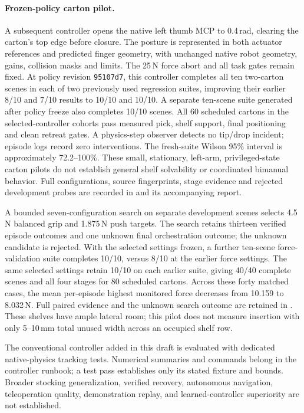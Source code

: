 \paragraph{Frozen-policy carton pilot.}
A subsequent controller opens the native left thumb MCP to 0.4\,rad, clearing
the carton's top edge before closure. The posture is represented in both actuator
references and predicted finger geometry, with unchanged native robot geometry,
gains, collision masks and limits. The 25\,N force abort and all task gates remain
fixed. At policy revision \texttt{95107d7}, this controller completes all ten
two-carton scenes in each of two previously used regression suites, improving
their earlier 8/10 and 7/10 results to 10/10 and 10/10. A separate ten-scene suite
generated after policy freeze also completes 10/10 scenes. All 60 scheduled
cartons in the selected-controller cohorts pass measured pick, shelf support,
final positioning and clean retreat gates. A physics-step observer detects no
tip/drop incident; episode logs record zero interventions.
The fresh-suite Wilson 95\% interval is approximately 72.2--100\%.
These small, stationary, left-arm, privileged-state carton pilots do not establish
general shelf solvability or coordinated bimanual behavior. Full configurations,
source fingerprints, stage evidence and rejected development probes are recorded
in  and its accompanying report.

A bounded seven-configuration search on separate development scenes selects
4.5\,N balanced grip and 1.875\,N push targets. The search retains thirteen
verified episode outcomes and one unknown final orchestration outcome; the
unknown candidate is rejected. With the selected settings frozen, a further
ten-scene force-validation suite completes 10/10, versus 8/10 at the earlier
force settings. The same selected settings retain 10/10 on each earlier suite,
giving 40/40 complete scenes and all four stages for 80 scheduled cartons.
Across these forty matched cases, the mean per-episode highest monitored force
decreases from 10.159 to 8.032\,N. Full paired evidence and the unknown search
outcome are retained in .
These shelves have ample lateral room; this pilot does not measure insertion
with only 5--10\,mm total unused width across an occupied shelf row.

The conventional controller added in this draft is evaluated with dedicated
native-physics tracking tests. Numerical summaries and commands belong in the
controller runbook; a test pass establishes only its stated fixture and bounds.
Broader stocking generalization, verified recovery, autonomous navigation, teleoperation quality,
demonstration replay, and learned-controller superiority are not established.
